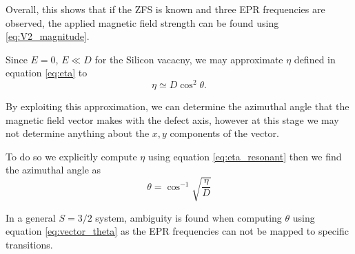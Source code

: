 Overall, this shows that if the ZFS is known and three EPR frequencies are observed, the applied magnetic field strength can be found using \eqref{eq:V2_magnitude}.






%


Since $E = 0$, $E \ll D$ for the Silicon vacacny, we may approximate $\eta$ defined in equation \eqref{eq:eta} to
\begin{equation}
	\eta \simeq D \cos^2 \theta.
	\label{eq:}
\end{equation}

By exploiting this approximation, we can determine the azimuthal angle that the magnetic field vector makes with the defect axis, however at this stage we may not determine anything about the $x,y$ components of the vector.

To do so we explicitly compute $\eta$ using equation \eqref{eq:eta_resonant} then we find the azimuthal angle as
\begin{equation}
	\theta = \cos^{-1}\sqrt{\frac{\eta}{D}}
	\label{eq:vector_theta}
\end{equation}


%
In a general $S = 3/2$ system, ambiguity is found when computing $\theta$ using equation \eqref{eq:vector_theta} as the EPR frequencies can not be mapped to specific transitions.

